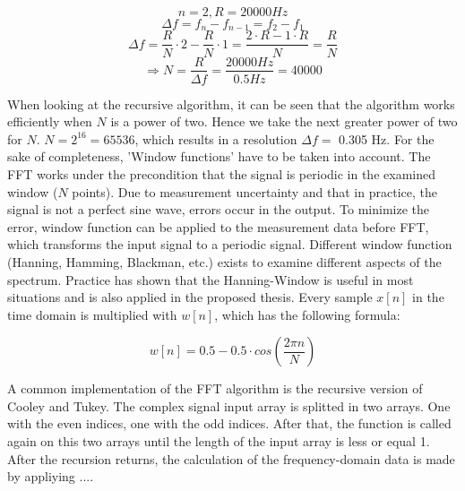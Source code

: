 \[ n = 2, R = 20000 Hz \]
\[ \Delta f = f_{n} - f_{n-1} = f_{2} - f_{1} \]
\[ \Delta f = \frac{R}{N} \cdot 2 - \frac{R}{N} \cdot 1 = \frac{2 \cdot R - 1 \cdot R}{N} = \frac{R}{N} \]
\[ \Rightarrow N = \frac{R}{\Delta f} = \frac{20000 Hz}{0.5 Hz} = 40000 \]

When looking at the recursive algorithm, it can be seen that the algorithm works efficiently when $N$ is a power of two. Hence we take the next greater power of two for $N$. $N = 2^{16} = 65536$, which results in a resolution $\Delta f = $ 0.305 Hz.
\newline
\newline
For the sake of completeness, 'Window functions' have to be taken into account. The FFT works under the precondition that the signal is periodic in the examined window ($N$ points). Due to measurement uncertainty and that in practice, the signal is not a perfect sine wave, errors occur in the output. To minimize the error, window function can be applied to the measurement data before FFT, which transforms the input signal to a periodic signal. Different window function (Hanning, Hamming, Blackman, etc.) exists to examine different aspects of the spectrum. Practice has shown that the Hanning-Window is useful in most situations and is also applied in the proposed thesis. Every sample $x[n]$ in the time domain is multiplied with $w[n]$, which has the following formula\cite{signalverarbeitung}:

\[w[n] = 0.5 - 0.5 \cdot cos(\frac{2 \pi n}{N})\]

A common implementation of the FFT algorithm is the recursive version of Cooley and Tukey. The complex signal input array is splitted in two arrays. One with the even indices, one with the odd indices. After that, the function is called again on this two arrays until the length of the input array is less or equal 1. After the recursion returns, the calculation of the frequency-domain data is made by appliying .... 

